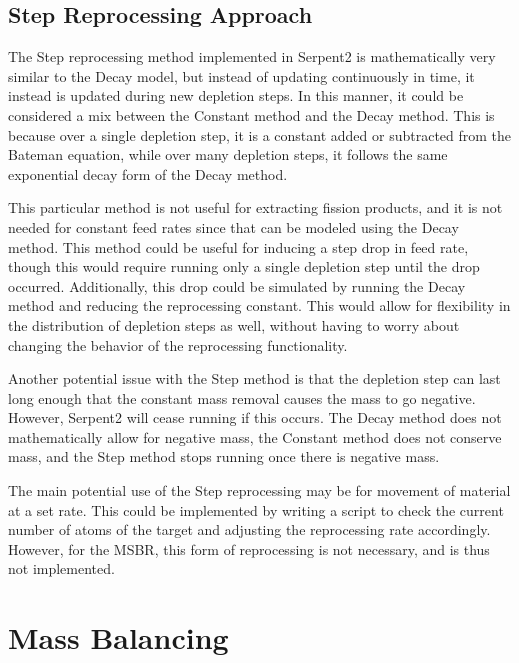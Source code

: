 
\subsection{Step Reprocessing Approach}

The Step reprocessing method implemented in Serpent2 is mathematically very similar to the Decay model, but instead of updating continuously in time, it instead is updated during new depletion steps. In this manner, it could be considered a mix between the Constant method and the Decay method. This is because over a single depletion step, it is a constant added or subtracted from the Bateman equation, while over many depletion steps, it follows the same exponential decay form of the Decay method.

This particular method is not useful for extracting fission products, and it is not needed for constant feed rates since that can be modeled using the Decay method. This method could be useful for inducing a step drop in feed rate, though this would require running only a single depletion step until the drop occurred. Additionally, this drop could be simulated by running the Decay method and reducing the reprocessing constant. This would allow for flexibility in the distribution of depletion steps as well, without having to worry about changing the behavior of the reprocessing functionality. 

Another potential issue with the Step method is that the depletion step can last long enough that the constant mass removal causes the mass to go negative. However, Serpent2 will cease running if this occurs. The Decay method does not mathematically allow for negative mass, the Constant method does not conserve mass, and the Step method stops running once there is negative mass.

The main potential use of the Step reprocessing may be for movement of material at a set rate. This could be implemented by writing a script to check the current number of atoms of the target and adjusting the reprocessing rate accordingly. However, for the MSBR, this form of reprocessing is not necessary, and is thus not implemented.

\section{Mass Balancing}
\label{s:mass-bal-meth}


